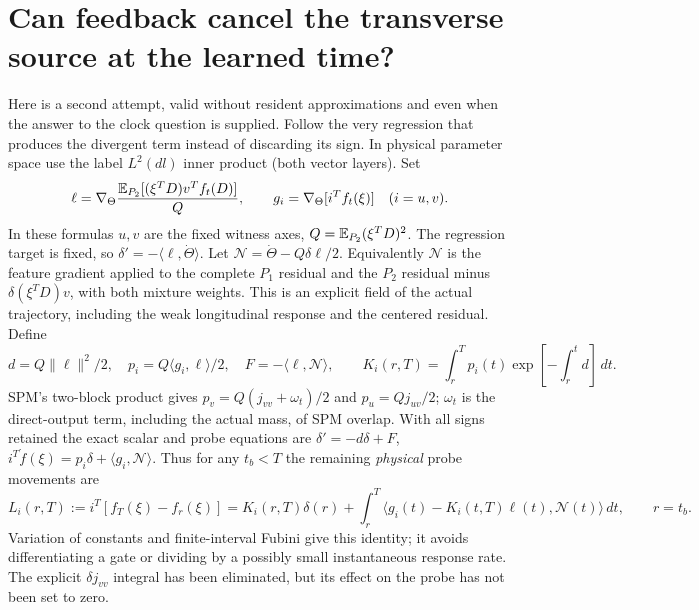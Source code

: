 \documentclass[11pt]{article}
\begin{document}
\section{Can feedback cancel the transverse source at the learned time?}
Here is a second attempt, valid without resident approximations and
even when the answer to the clock question is supplied. Follow the
very regression that produces the divergent term instead of discarding
its sign. In physical parameter space use the label $L^2(dl)$
inner product (both vector layers). Set
\[
 \ell=\nabla_\Theta\frac{\mathbb E_{P_2}[(\xi^TD)v^Tf_t(D)]}{Q},
 \qquad g_i=\nabla_\Theta[i^Tf_t(\xi)]\quad(i=u,v).
\]
In these formulas $u,v$ are the fixed witness axes, $Q=\mathbb E_{P_2}(\xi^TD)^2$.
The regression target is fixed, so $\delta'=-\langle\ell,\dot\Theta\rangle$.
Let $\mathcal N=\dot\Theta-Q\delta\ell/2$.
Equivalently $\mathcal N$ is the feature gradient applied to the
complete $P_1$ residual and the $P_2$ residual minus
$\delta(\xi^TD)v$, with both mixture weights. This is an explicit
field of the actual trajectory, including the weak longitudinal
response and the centered residual. Define
\[
 d=Q\|\ell\|^2/2,\quad p_i=Q\langle g_i,\ell\rangle/2,\quad
 F=-\langle\ell,\mathcal N\rangle,\qquad
 K_i(r,T)=\int_r^T p_i(t)\exp[-\textstyle\int_r^t d]\,dt .
\]
SPM's two-block product gives
$p_v=Q(j_{vv}+\omega_t)/2$ and $p_u=Qj_{uv}/2$; $\omega_t$ is
the direct-output term, including the actual mass, of SPM overlap.
With all signs retained the exact scalar and probe equations are
$\delta'=-d\delta+F$,
$i^T\dot f(\xi)=p_i\delta+\langle g_i,\mathcal N\rangle$.
Thus for any $t_b<T$ the remaining \emph{physical} probe movements are
\begin{equation}\label{an04tbwv1:filter}
 L_i(r,T):=i^T[f_T(\xi)-f_r(\xi)]
  =K_i(r,T)\delta(r)+
    \int_r^T\langle g_i(t)-K_i(t,T)\ell(t),\mathcal N(t)\rangle\,dt,
 \qquad r=t_b .
\end{equation}
Variation of constants and finite-interval Fubini give this identity;
it avoids differentiating a gate or dividing by a possibly small
instantaneous response rate. The explicit $\delta j_{vv}$ integral
has been eliminated, but its effect on the probe has not been set
to zero.
\end{document}
